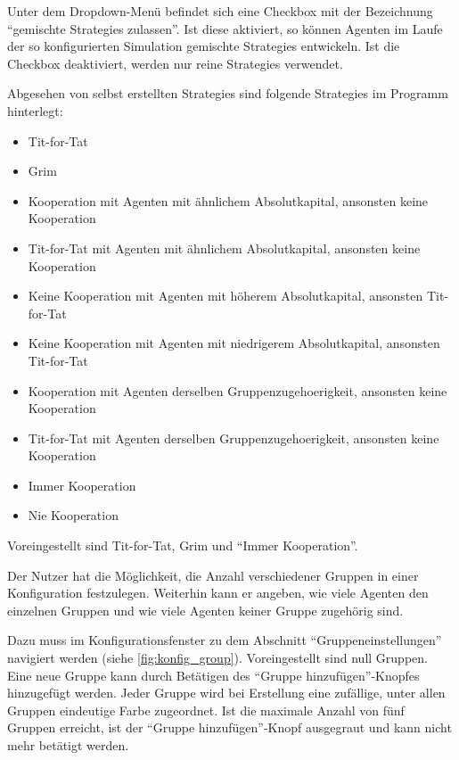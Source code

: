\documentclass[parskip=full,11pt]{scrartcl}
\begin{document}
Unter dem Dropdown-Menü befindet sich eine Checkbox mit der Bezeichnung \enquote{\Glspl{gemischte Strategie} zulassen}. Ist diese aktiviert, so können Agenten im Laufe der so konfigurierten Simulation \glspl{gemischte Strategie} entwickeln. Ist die Checkbox deaktiviert, werden nur reine \Glspl{Strategie} verwendet.

Abgesehen von selbst erstellten \Glspl{Strategie} sind folgende \Glspl{Strategie} im Programm hinterlegt:
\begin{itemize} \itemsep -10pt
\item Tit-for-Tat
\item Grim
\item Kooperation mit Agenten mit ähnlichem Absolutkapital, ansonsten keine Kooperation
\item Tit-for-Tat mit Agenten mit ähnlichem Absolutkapital, ansonsten keine Kooperation
\item Keine Kooperation mit Agenten mit höherem Absolutkapital, ansonsten Tit-for-Tat
\item Keine Kooperation mit Agenten mit niedrigerem Absolutkapital, ansonsten Tit-for-Tat
\item Kooperation mit Agenten derselben \Gls{Gruppenzugehoerigkeit}, ansonsten keine Kooperation
\item Tit-for-Tat mit Agenten derselben \Gls{Gruppenzugehoerigkeit}, ansonsten keine Kooperation
\item Immer Kooperation
\item Nie Kooperation
\end{itemize}
Voreingestellt sind Tit-for-Tat, Grim und \enquote{Immer Kooperation}.

Der \Gls{Nutzer} hat die Möglichkeit, die Anzahl verschiedener Gruppen in einer \Gls{Konfiguration} festzulegen. Weiterhin kann er angeben, wie viele Agenten den einzelnen Gruppen und wie viele Agenten keiner Gruppe zugehörig sind.

Dazu muss im Konfigurationsfenster zu dem Abschnitt \enquote{Gruppeneinstellungen} navigiert werden (siehe \cref{fig:konfig_group}). Voreingestellt sind null Gruppen. Eine neue Gruppe kann durch Betätigen des \enquote{Gruppe hinzufügen}-Knopfes hinzugefügt werden. Jeder Gruppe wird bei Erstellung eine zufällige, unter allen Gruppen eindeutige Farbe zugeordnet. Ist die maximale Anzahl von fünf Gruppen erreicht, ist der \enquote{Gruppe hinzufügen}-Knopf ausgegraut und kann nicht mehr betätigt werden.
\end{document}
